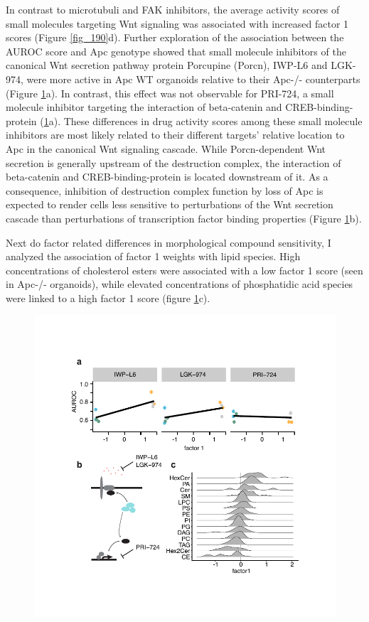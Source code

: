 \begin{flushleft}
In contrast to microtubuli and FAK inhibitors, the average activity scores of small molecules targeting Wnt signaling was associated with increased factor 1 scores (Figure \ref{fig_190}d). Further exploration of the association between the AUROC score and Apc genotype showed that small molecule inhibitors of the canonical Wnt secretion pathway protein Porcupine (Porcn), IWP-L6 and LGK-974, were more active in Apc WT organoids relative to their Apc-/- counterparts (Figure \ref{fig_199}a). In contrast, this effect was not observable for PRI-724, a small molecule inhibitor targeting the interaction of beta-catenin and CREB-binding-protein (\ref{fig_199}a). These differences in drug activity scores among these small molecule inhibitors are most likely related to their different targets' relative location to Apc in the canonical Wnt signaling cascade. While Porcn-dependent Wnt secretion is generally upstream of the destruction complex, the interaction of beta-catenin and CREB-binding-protein is located downstream of it. As a consequence, inhibition of destruction complex function by loss of Apc is expected to render cells less sensitive to perturbations of the Wnt secretion cascade than perturbations of transcription factor binding properties (Figure \ref{fig_199}b). 

Next do factor related differences in morphological compound sensitivity, I analyzed the association of factor 1 weights with lipid species. High concentrations of cholesterol esters were associated with a low factor 1 score (seen in Apc-/- organoids), while elevated concentrations of phosphatidic acid species were linked to a high factor 1 score (figure \ref{fig_199}c).


\begin{figure}[H]
\centering
\includegraphics[width=\textwidth,
                height=\textheight,
                keepaspectratio]{figures/adenomaprofiling/pdf/fig_2_2.pdf}
\caption{}
\label{fig_199}
\end{figure}
\bigbreak


\end{flushleft}
